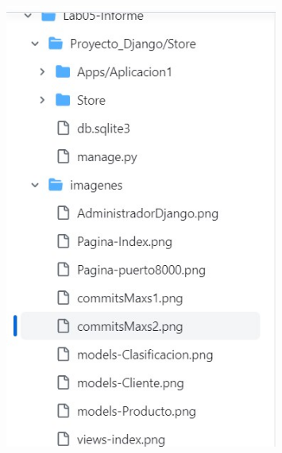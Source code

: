 \begin{figure}[H]
	\centering
	\includegraphics[width=0.8\textwidth,keepaspectratio]{img/estructura3.jpg}
\end{figure}

